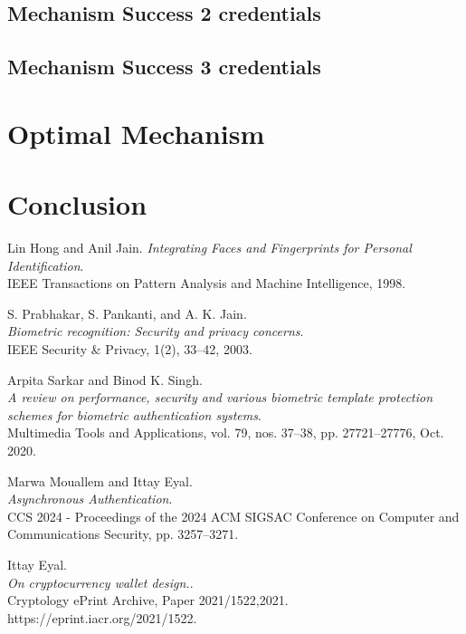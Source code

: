 \documentclass{article}
\begin{document}
\subsection{Mechanism Success 2 credentials}
\subsection{Mechanism Success 3 credentials}
\section{Optimal Mechanism}
\section{Conclusion}
\begin{thebibliography}{9}

Lin Hong and Anil Jain.
\textit{Integrating Faces and Fingerprints for Personal Identification}.\\
IEEE Transactions on Pattern Analysis and Machine Intelligence, 1998.

S. Prabhakar, S. Pankanti, and A. K. Jain.\\
\textit{Biometric recognition: Security and privacy concerns}.\\
IEEE Security \& Privacy, 1(2), 33–42, 2003.

Arpita Sarkar and Binod K. Singh.\\
\textit{A review on performance, security and various biometric template protection schemes for biometric authentication systems}.\\
Multimedia Tools and Applications, vol. 79, nos. 37–38, pp. 27721–27776, Oct. 2020.

Marwa Mouallem and Ittay Eyal.\\
\textit{Asynchronous Authentication}.\\
CCS 2024 - Proceedings of the 2024 ACM SIGSAC Conference on Computer and Communications Security, pp. 3257–3271.

Ittay Eyal.\\
\textit{On cryptocurrency wallet design.}.\\
Cryptology ePrint Archive, Paper 2021/1522,2021. https://eprint.iacr.org/2021/1522.
\end{thebibliography}
\end{document}
